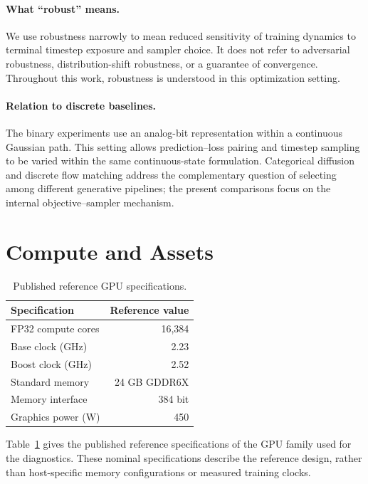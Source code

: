 \documentclass{article}
\theoremstyle{plain}
\theoremstyle{definition}
\theoremstyle{remark}
\begin{document}
\paragraph{What ``robust'' means.}
We use robustness narrowly to mean reduced sensitivity of training dynamics to terminal timestep exposure and sampler choice. It does not refer to adversarial robustness, distribution-shift robustness, or a guarantee of convergence. Throughout this work, robustness is understood in this optimization setting.

\paragraph{Relation to discrete baselines.}
The binary experiments use an analog-bit representation within a continuous Gaussian path. This setting allows prediction--loss pairing and timestep sampling to be varied within the same continuous-state formulation. Categorical diffusion and discrete flow matching address the complementary question of selecting among different generative pipelines; the present comparisons focus on the internal objective--sampler mechanism.

\section{Compute and Assets}
\label{app:compute}

\begin{table}
\vspace{-0.5\baselineskip}
\centering
\caption{Published reference GPU specifications.}
\label{tab:gpu_specs}
\setlength{\tabcolsep}{4pt}
\begin{tabular}{lr}
\toprule
Specification & Reference value \\
\midrule
FP32 compute cores & 16,384 \\
Base clock (GHz) & 2.23 \\
Boost clock (GHz) & 2.52 \\
Standard memory & 24 GB GDDR6X \\
Memory interface & 384 bit \\
Graphics power (W) & 450 \\
\bottomrule
\end{tabular}
\end{table}

Table~\ref{tab:gpu_specs} gives the published reference specifications of the GPU family used for the diagnostics. These nominal specifications describe the reference design, rather than host-specific memory configurations or measured training clocks.
\end{document}
